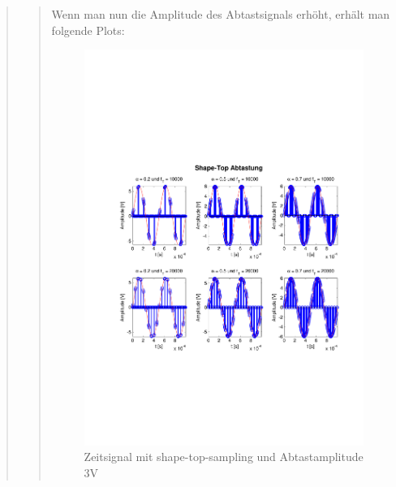 \begin{quote}
\begin{quote}
    	Wenn man nun die Amplitude des Abtastsignals erhöht, erhält man folgende
    	Plots:
    	
    	\begin{figure}[H]
        \centering
        \includegraphics[scale=0.7, trim = 1.5cm 6cm 1cm 8cm,
        clip]{./Bilder/shape-top-zeit_3V}
            \caption{Zeitsignal mit shape-top-sampling und Abtastamplitude 3V}
  	    \end{figure}
  	    

\end{quote}
\end{quote}
